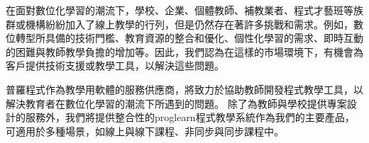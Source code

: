 在面對數位化學習的潮流下，學校、企業、個體教師、補教業者、程式才藝班等族群或機構紛紛加入了線上教學的行列，但是仍然存在著許多挑戰和需求\cite{ref:111產業產值調查報告}\cite{ref:110產業產值調查報告}。例如，數位轉型所具備的技術門檻、教育資源的整合和優化、個性化學習的需求、即時互動的困難與教師教學負擔的增加\cite{ref:老師的困難}等。因此，我們認為在這樣的市場環境下，有機會為客戶提供技術支援或教學工具，以解決這些問題。

普羅程式作為教學用軟體的服務供應商，將致力於協助教師開發程式教學工具，以解決教育者在數位化學習的潮流下所遇到的問題。
除了為教師與學校提供專案設計的服務外，我們將提供整合性的proglearn程式教學系統作為我們的主要產品，可適用於多種場景，如線上與線下課程、非同步與同步課程中。








